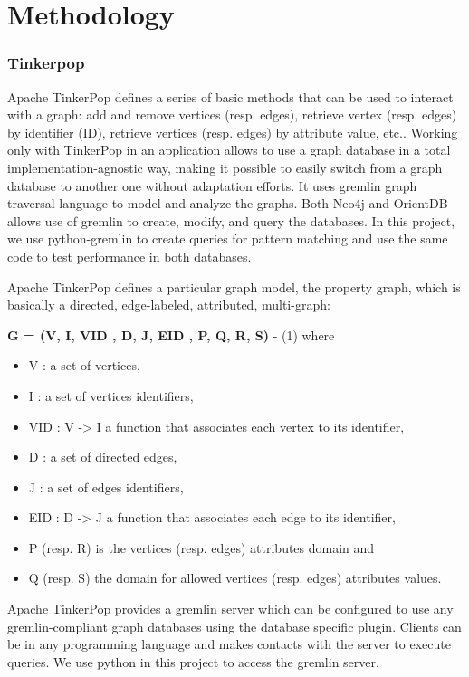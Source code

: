 \section{Methodology}

\subsubsection{Tinkerpop}

Apache TinkerPop defines a series of basic methods that can be used to interact with a graph: add and remove vertices (resp. edges), retrieve vertex (resp. edges) by identifier (ID), retrieve vertices (resp. edges) by attribute value, etc.. Working only with TinkerPop in an application allows to use a graph database in a total implementation-agnostic way, making it possible to easily switch from a graph database to another one without adaptation efforts. It uses gremlin graph traversal language to model and analyze the graphs. Both Neo4j and OrientDB allows use of gremlin to create, modify, and query the databases. In this project, we use python-gremlin to create queries for pattern matching and use the same code to test performance in both databases. 

Apache TinkerPop defines a particular graph model, the property graph, which is basically a directed, edge-labeled, attributed, multi-graph:

\textbf{G = (V, I, VID , D, J, EID , P, Q, R, S)} - (1)
where 
\begin{itemize}
\item V : a set of vertices, 
\item I : a set of vertices identifiers, 
\item VID : V -> I a function that associates each vertex to its identifier, 
\item D : a set of directed edges, 
\item J : a set of edges identifiers, 
\item EID : D -> J a function that associates each edge to its identifier, 
\item P (resp. R) is the vertices (resp. edges) attributes domain and 
\item Q (resp. S) the domain for allowed vertices (resp. edges) attributes values.
\end{itemize}


Apache TinkerPop provides a gremlin server which can be configured to use any gremlin-compliant graph databases using the database specific plugin. Clients can be in any programming language and makes contacts with the server to execute queries. We use python in this project to access the gremlin server.

